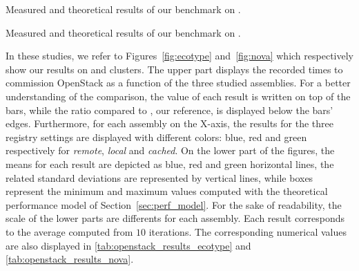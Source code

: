 \begin{table}
    \begin{center}
        
        \caption{Measured and theoretical results of our benchmark on \ecotype.}
        \label{tab:openstack_results_ecotype}
    \end{center}
\end{table}

\begin{table}
    \begin{center}
        
        \caption{Measured and theoretical results of our benchmark on \nova.}
        \label{tab:openstack_results_nova}
    \end{center}
\end{table}


In these studies, we refer to Figures~\ref{fig:ecotype}
and~\ref{fig:nova} which respectively show our results on \ecotype and
\nova clusters. The upper part displays the recorded times to
commission OpenStack as a function of the three studied assemblies.
For a better understanding of the comparison, the value of
each result is written on top of the bars, while the ratio compared to
\ansass, our reference, is displayed below the bars' edges.
Furthermore, for each assembly on the X-axis, the results for the
three \docker registry settings are displayed with different colors:
blue, red and green respectively for \emph{remote}, \emph{local} and
\emph{cached}. On the lower part of the figures, the means for each
result are depicted as blue, red and green horizontal lines, the
related standard deviations are represented by vertical lines, while
boxes represent the minimum and maximum values computed with the
theoretical performance model of Section~\ref{sec:perf_model}.
% 
For the sake of readability, the scale of the lower parts are
differents for each assembly. Each result corresponds to the average
computed from $10$ iterations. The corresponding numerical values are
also displayed in \cref{tab:openstack_results_ecotype} and \cref{tab:openstack_results_nova}.
%


